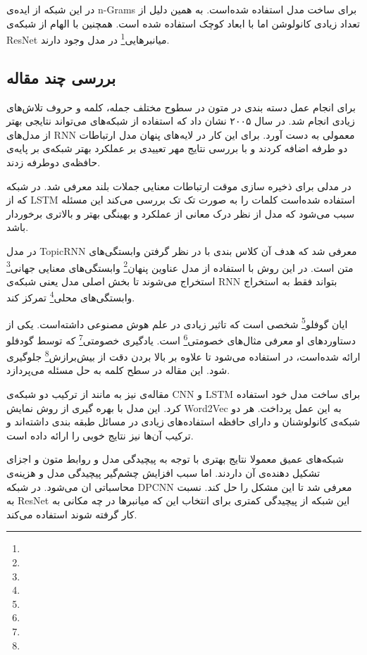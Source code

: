 \documentclass[12pt, a4paper, oneside]{report}
\begin{document}
در این شبکه از ایده‌ی
n-Grams
برای ساخت مدل استفاده شده‌است. به همین دلیل از تعداد زیادی کانولوشن اما با ابعاد کوچک استفاده شده است.
همچنین با الهام از شبکه‌ی
ResNet
میانبر‌هایی\footnote{}
در مدل وجود دارند.

\subsection{بررسی چند مقاله}

برای انجام عمل دسته بندی در متون در سطوح مختلف جمله، کلمه و حروف تلاش‌های زیادی انجام شد.
\cite{graves2005framewise}
در سال ۲۰۰۵ نشان داد که استفاده از شبکه‌های
می‌تواند نتایجی بهتر از مدل‌های
RNN
معمولی به دست آورد. برای این کار در لایه‌های پنهان مدل ارتباطات دو طرفه اضافه کردند و با بررسی نتایج مهر تعییدی
بر عملکرد بهتر شبکه‌ی بر پایه‌ی حافظه‌ی دوطرفه زدند.

در
\cite{liu2016recurrent}
مدلی برای ذخیره سازی موقت ارتباطات معنایی جملات بلند معرفی شد. در شبکه که از
LSTM
استفاده شده‌است کلمات را به صورت تک تک بررسی می‌کند این مسئله سبب می‌شود که مدل از نظر درک
معانی از عملکرد و بهینگی بهتر و بالاتری برخوردار باشد.

در
\cite{dieng2016topicrnn}
مدل
TopicRNN
معرفی شد که هدف آن کلاس بندی با در نظر گرفتن وابستگی‌های متن است.
در این روش با استفاده از
مدل عناوین پنهان\footnote{}
وابستگی‌های معنایی
جهانی\footnote{}
استخراج می‌شوند تا بخش اصلی مدل یعنی شبکه‌ی
RNN
بتواند فقط به استخراج وابستگی‌های
محلی\footnote{}
تمرکز کند.

ایان گوفلو\footnote{}
شخصی است که تاثیر زیادی در علم هوش مصنوعی داشته‌است. یکی از دستاورد‌های او معرفی
مثال‌های خصومتی\footnote{}
است.
یادگیری خصومتی\footnote{}
که توسط گودفلو ارائه شده‌است، در
\cite{miyato2017adversarial}
استفاده می‌شود تا علاوه بر بالا بردن دقت از
بیش‌برازش\footnote{}
جلوگیری شود. این مقاله در سطح کلمه به حل مسئله می‌پردازد.

مقاله‌ی
\cite{guggilla-etal-2016-cnn}
نیز به مانند 
\cite{wang-etal-2016-combination}
از ترکیب دو شبکه‌ی
CNN
و
LSTM
برای ساخت مدل خود استفاده کرد. این مدل با بهره گیری از روش نمایش
Word2Vec
به این عمل پرداخت. هر دو شبکه‌ی کانولوشنان و دارای حافظه استفاده‌های زیادی در مسائل طبقه بندی داشته‌اند و ترکیب آن‌ها
نیز نتایج خوبی را ارائه داده است.

شبکه‌های عمیق معمولا نتایج بهتری با توجه به پیچیدگی مدل و روابط متون و اجزای تشکیل دهنده‌ی آن داردند.
اما سبب افزایش چشم‌گیر پیچیدگی مدل و هزینه‌ی محاسباتی ان می‌شود.
در
\cite{johnson-zhang-2017-deep}
شبکه
DPCNN
معرفی شد تا این مشکل را حل کند. نسبت به
ResNet
این شبکه از پیچیدگی کمتری برای انتخاب این که میانبرها در چه مکانی به کار گرفته شوند استفاده می‌کند.
\end{document}
